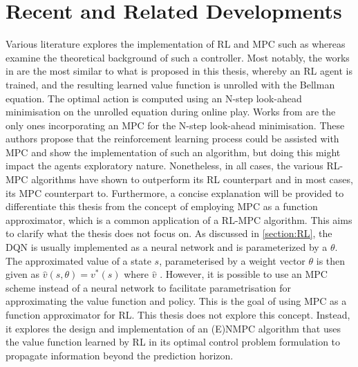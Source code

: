 \section{Recent and Related Developments}
Various literature explores the implementation of RL and MPC  such as \cite{arroyoReinforcedModelPredictive2022,beckenbachAddressingInfinitehorizonOptimization2018,lubarsCombiningReinforcementLearning2021,lubbersAutonomousGreenhouseClimate2023,sikchiLearningOffPolicyOnline2021,} whereas  \cite{beckenbachAddressingInfinitehorizonOptimization2018,bertsekasLessonsAlphaZeroOptimal,bertsekasNewtonMethodReinforcement2022,linReinforcementLearningBasedModel2023} examine the theoretical background of such a controller.
Most notably, the works in \citet{sikchiLearningOffPolicyOnline2021,arroyoReinforcedModelPredictive2022,linReinforcementLearningBasedModel2023,bertsekasLessonsAlphaZeroOptimal} are the most similar to what is proposed in this thesis, whereby an RL agent is trained, and the resulting learned value function is unrolled with the Bellman equation. The optimal action is computed using an N-step look-ahead minimisation on the unrolled equation during online play. Works from \cite{arroyoReinforcedModelPredictive2022,linReinforcementLearningBasedModel2023,beckenbachAddressingInfinitehorizonOptimization2018} are the only ones incorporating an MPC for the N-step look-ahead minimisation. These authors propose that the reinforcement learning process could be assisted with MPC and show the implementation of such an algorithm, but doing this might impact the agents exploratory nature. Nonetheless, in all cases, the various RL-MPC algorithms have shown to outperform its RL counterpart and in most cases, its MPC counterpart to. Furthermore, a concise explanation will be provided to differentiate this thesis from the concept of employing MPC as a function approximator, which is a common application of a RL-MPC algorithm. This aims to clarify what the thesis does not focus on. As discussed in \autoref{section:RL}, the DQN is usually implemented as a neural network and is parameterized by a ${\theta}$. The approximated value of a state $s$, parameterised by a weight vector  $\theta$ is then given as $ \hat{v}(s,\theta) = v^*(s)$ where $\hat{v}$ \cite{lubbersAutonomousGreenhouseClimate2023}. However, it is possible to use an MPC scheme instead of a neural network to facilitate parametrisation for approximating the value function and policy. This is the goal of using MPC as a function approximator for RL. This thesis does not explore this concept. Instead, it explores the design and implementation of an (E)NMPC algorithm that uses the value function learned by RL in its optimal control problem formulation to propagate information beyond the prediction horizon. 


